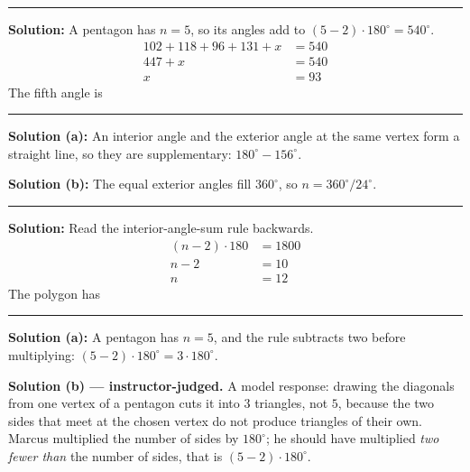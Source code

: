 \documentclass[12pt]{article}
\begin{document}
\vspace{0.2cm}\noindent\rule{\linewidth}{0.2pt}


\textbf{Solution:} A pentagon has $n = 5$, so its angles add to $(5-2)\cdot 180^\circ = 540^\circ$.
\begin{align*}
  102 + 118 + 96 + 131 + x &= 540 \\
  447 + x &= 540 \\
  x &= 93
\end{align*}
The fifth angle is 

\vspace{0.2cm}\noindent\rule{\linewidth}{0.2pt}


\textbf{Solution (a):} An interior angle and the exterior angle at the same vertex form a straight line, so they are supplementary: $180^\circ - 156^\circ$. 

\textbf{Solution (b):} The equal exterior angles fill $360^\circ$, so $n = 360^\circ / 24^\circ$. 

\vspace{0.2cm}\noindent\rule{\linewidth}{0.2pt}


\textbf{Solution:} Read the interior-angle-sum rule backwards.
\begin{align*}
  (n-2)\cdot 180 &= 1800 \\
  n-2 &= 10 \\
  n &= 12
\end{align*}
The polygon has 

\vspace{0.2cm}\noindent\rule{\linewidth}{0.2pt}


\textbf{Solution (a):} A pentagon has $n = 5$, and the rule subtracts two before multiplying: $(5-2)\cdot 180^\circ = 3 \cdot 180^\circ$. 

\textbf{Solution (b) --- instructor-judged.} A model response: drawing the diagonals from one vertex of a pentagon cuts it into $3$ triangles, not $5$, because the two sides that meet at the chosen vertex do not produce triangles of their own. Marcus multiplied the number of sides by $180^\circ$; he should have multiplied \emph{two fewer than} the number of sides, that is $(5-2)\cdot 180^\circ$.
\end{document}
